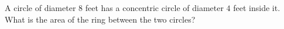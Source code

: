 A circle of diameter $8$ feet has a concentric circle of diameter $4$ feet inside it. What is the area of the ring between the two circles?
